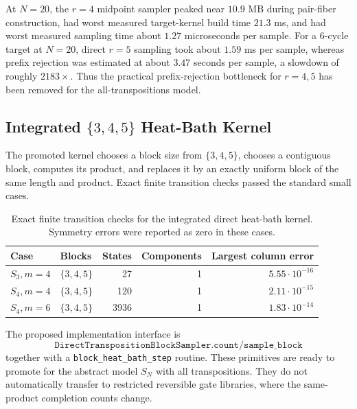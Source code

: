 At $N=20$, the $r=4$ midpoint sampler peaked near $10.9$ MB during pair-fiber
construction, had worst measured target-kernel build time $21.3$ ms, and had
worst measured sampling time about $1.27$ microseconds per sample.  For a
6-cycle target at $N=20$, direct $r=5$ sampling took about $1.59$ ms per sample,
whereas prefix rejection was estimated at about $3.47$ seconds per sample, a
slowdown of roughly $2183\times$.  Thus the practical prefix-rejection
bottleneck for $r=4,5$ has been removed for the all-transpositions model.

\subsection{\texorpdfstring{Integrated $\{3,4,5\}$ Heat-Bath Kernel}{Integrated {3,4,5} Heat-Bath Kernel}}

The promoted kernel chooses a block size from $\{3,4,5\}$, chooses a contiguous
block, computes its product, and replaces it by an exactly uniform block of the
same length and product.  Exact finite transition checks passed the standard
small cases.

\begin{table}[ht]
\centering
\begin{tabular}{llrrr}
\toprule
Case & Blocks & States & Components & Largest column error \\
\midrule
$S_3,m=4$ & $\{3,4,5\}$ & 27 & 1 & $5.55\cdot 10^{-16}$ \\
$S_4,m=4$ & $\{3,4,5\}$ & 120 & 1 & $2.11\cdot 10^{-15}$ \\
$S_4,m=6$ & $\{3,4,5\}$ & 3936 & 1 & $1.83\cdot 10^{-14}$ \\
\bottomrule
\end{tabular}
\caption{Exact finite transition checks for the integrated direct heat-bath
kernel.  Symmetry errors were reported as zero in these cases.}
\label{tab:direct-heatbath-checks}
\end{table}

The proposed implementation interface is
\[
\texttt{DirectTranspositionBlockSampler.count/sample\_block}
\]
together with a \texttt{block\_heat\_bath\_step} routine.  These primitives are
ready to promote for the abstract model $S_N$ with all transpositions.  They do
not automatically transfer to restricted reversible gate libraries, where the
same-product completion counts change.
